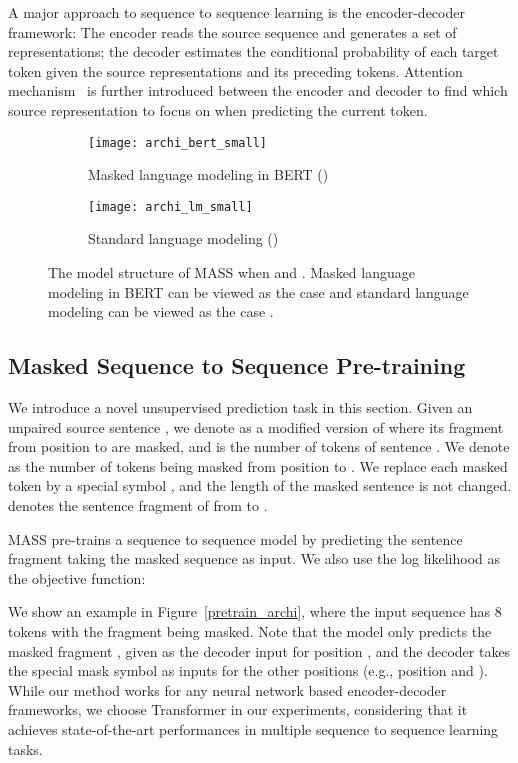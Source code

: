 \documentclass{article}
\begin{document}
	A major approach to sequence to sequence learning is the encoder-decoder framework: The encoder reads the source sequence and generates a set of representations; the decoder estimates the conditional probability of each target token given the source representations and its preceding tokens. Attention mechanism~\citep{DBLP:journals/corr/BahdanauCB14} is further introduced between the encoder and decoder to find which source representation to focus on when predicting the current token.
	
	\begin{figure*}[!t]
		\small
		\centering
		\begin{subfigure}{0.47\textwidth} \texttt{[image: archi\_bert\_small]}
			\caption{Masked language modeling in BERT ()} \label{like_bert}
		\end{subfigure}
\begin{subfigure}{0.47\textwidth} \texttt{[image: archi\_lm\_small]}
			\caption{Standard language modeling ()} \label{like_lm}
		\end{subfigure}
		\vspace{-0.2cm}
		\caption{The model structure of MASS when  and . Masked language modeling in BERT can be viewed as the case  and standard language modeling can be viewed as the case .} 
		\label{fig_mass_cover}
	\end{figure*}
	
	
	\subsection{Masked Sequence to Sequence Pre-training}
	\label{sec_mask_seq2seq}
	We introduce a novel unsupervised prediction task in this section. Given an unpaired source sentence , we denote  as a modified version of  where its fragment from position  to  are masked,  and  is the number of tokens of sentence . We denote  as the number of tokens being masked from position  to . We replace each masked token by a special symbol , and the length of the masked sentence is not changed.  denotes the sentence fragment of  from  to .
	
	MASS pre-trains a sequence to sequence model by predicting the sentence fragment  taking the masked sequence  as input. We also use the log likelihood as the objective function:
	
	We show an example in Figure~\ref{pretrain_archi}, where the input sequence has 8 tokens with the fragment  being masked. Note that the model only predicts the masked fragment , given  as the decoder input for position , and the decoder takes the special mask symbol  as inputs for the other positions (e.g., position  and ). While our method works for any neural network based encoder-decoder frameworks, we choose Transformer in our experiments, considering that it achieves state-of-the-art performances in multiple sequence to sequence learning tasks.
	
\end{document}
